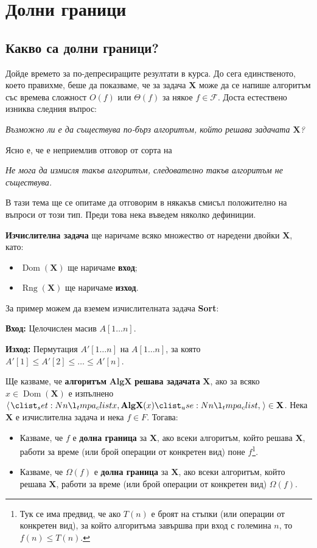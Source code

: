 \chapter{Долни граници}

\section{Какво са долни граници?}

Дойде времето за по-депресиращите резултати в курса.
До сега единственото, което правихме, беше да показваме, че за задача $\mathbf{X}$ може да се напише алгоритъм със времева сложност $O(f)$ или $\Theta(f)$ за някое $f \in \mathcal{F}$.
Доста естествено изниква следния въпрос:
\begin{center}
    \textit{Възможно ли е да съществува по-бърз алгоритъм, който решава задачата $\mathbf{X}$?}
\end{center}
Ясно е, че е неприемлив отговор от сорта на
\begin{center}
    \textit{Не мога да измисля такъв алгоритъм, следователно такъв алгоритъм не съществува.}
\end{center}
В тази тема ще се опитаме да отговорим в някакъв смисъл положително на въпроси от този тип.
Преди това нека въведем няколко дефиниции.

\textbf{Изчислителна задача} ще наричаме всяко множество от наредени двойки $\mathbf{X}$, като:
\begin{itemize}
    \item $\operatorname{Dom}(\mathbf{X})$ ще наричаме \textbf{вход};
    \item $\operatorname{Rng}(\mathbf{X})$ ще наричаме \textbf{изход}.
\end{itemize}
За пример можем да вземем изчислителната задача \textbf{Sort}:

\vspace*{2mm}
\textbf{Вход:} Целочислен масив $A[1 \dots n]$.

\textbf{Изход:} Пермутация $A'[1 \dots n]$ на $A[1 \dots n]$, за която $A'[1] \leq A'[2] \leq \dots \leq A'[n]$.
\vspace*{2mm}

\newpage

Ще казваме, че \textbf{алгоритъм} $\mathbf{AlgX}$ \textbf{решава задачата} $\mathbf{X}$, ако за всяко $x \in \operatorname{Dom}(\mathbf{X})$ е изпълнено $\opair{x, \mathbf{AlgX}(x)} \in \mathbf{X}$.
Нека $\mathbf{X}$ е изчислителна задача и нека $f \in F$.
Тогава:
\begin{itemize}
    \item Казваме, че $f$ е \textbf{долна граница} за $\mathbf{X}$, ако всеки алгоритъм, който решава $\mathbf{X}$, работи за време (или брой операции от конкретен вид) поне $f$\footnote{
              Тук се има предвид, че ако $T(n)$ е броят на стъпки (или операции от конкретен вид), за който алгоритъма завършва при вход с големина $n$, то $f(n) \leq T(n)$.
          }.
    \item Казваме, че $\Omega(f)$ е \textbf{долна граница} за $\mathbf{X}$, ако всеки алгоритъм, който решава $\mathbf{X}$, работи за време (или брой операции от конкретен вид) $\Omega(f)$.
\end{itemize}
